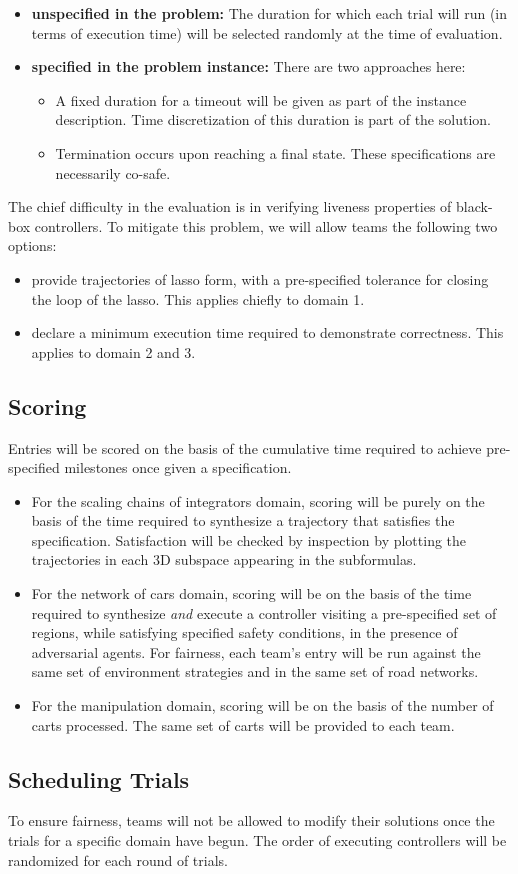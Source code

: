 \documentclass{amsart}
\theoremstyle{definition}
\begin{document}
\begin{itemize}
\item \textbf{unspecified in the problem:}
The duration for which each trial will run (in terms of execution time) will be selected randomly at the time of evaluation.

\item \textbf{specified in the problem instance:}
There are two approaches here:
\begin{itemize}
\item A fixed duration for a timeout will be given as part of the instance description. Time discretization of this duration is part of the solution.
\item Termination occurs upon reaching a final state. These specifications are necessarily co-safe.
\end{itemize}

\end{itemize}

The chief difficulty in the evaluation is in verifying liveness properties of black-box controllers. To mitigate this problem,
we will allow teams the following two options:
\begin{itemize}
\item provide trajectories of lasso form, with a pre-specified tolerance for closing the loop of the lasso. This applies chiefly to domain 1.
\item declare a minimum execution time required to demonstrate correctness. This applies to domain 2 and 3.
\end{itemize}

\subsection{Scoring}
Entries will be scored on the basis of the cumulative time required to achieve pre-specified milestones once given a specification.

\begin{itemize}
\item For the scaling chains of integrators domain, scoring will be purely on the basis of the time required to synthesize a trajectory that 
satisfies the specification. Satisfaction will be checked by inspection by plotting the trajectories in each 3D subspace appearing in the
subformulas.
\item For the network of cars domain, scoring will be on the basis of the time required to synthesize \emph{and} execute a controller
visiting a pre-specified set of regions, while satisfying specified safety conditions, in the presence of adversarial agents. For fairness, 
each team's entry will be run against the same set of environment strategies and in the same set of road networks.
\item For the manipulation domain, scoring will be on the basis of the number of carts processed. The same set of carts will be provided 
to each team.
\end{itemize}


\subsection{Scheduling Trials}
To ensure fairness, teams will not be allowed to modify their solutions once the trials for a specific domain have begun. The order of executing
controllers will be randomized for each round of trials.



\end{document}

